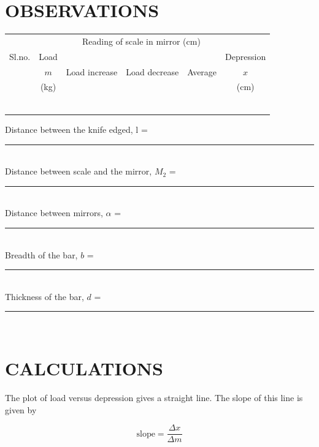 \documentclass[12pt,a4paper]{article}
\begin{document}
	\section{OBSERVATIONS}
		\begin{center}
			\begin{tabular}{|c|c|c|c|c|c|}
			\hline
			\rowcolor{b1!50}&& \multicolumn{3}{c|}{Reading of scale in mirror (cm)} & \\
			\rowcolor{b1!50}\cline{3-5}
			\rowcolor{b1!50}Sl.no.& Load&&&& Depression\\
			\rowcolor{b1!50}& $m$&Load increase&Load decrease&Average&$x$\\
			\rowcolor{b1!50}& (kg) &&&&(cm)\\
			\hline
			&&&&&\\&&&&&\\&&&&&\\&&&&&\\&&&&&\\&&&&&\\
			\hline
		\end{tabular}
		\end{center} 	
			\vspace{10pt}
			Distance between the knife edged, l = \rule{10ex}{0.2pt}\\
			Distance between scale and the mirror, $M_2$ =\rule{10ex}{0.2pt}\\
			Distance between mirrors, $\alpha$ = \rule{10ex}{0.2pt}\\
			Breadth of the bar, $b$ =\rule{10ex}{0.2pt}\\
			Thickness of the bar, $d$ =\rule{10ex}{0.2pt}\\
			
		\section{CALCULATIONS}
			
			The plot of load versus depression gives a straight line. The slope of this line is given by
			
			$$\text{slope}=\dfrac{\Delta x}{\Delta m}$$
			
\end{document}
